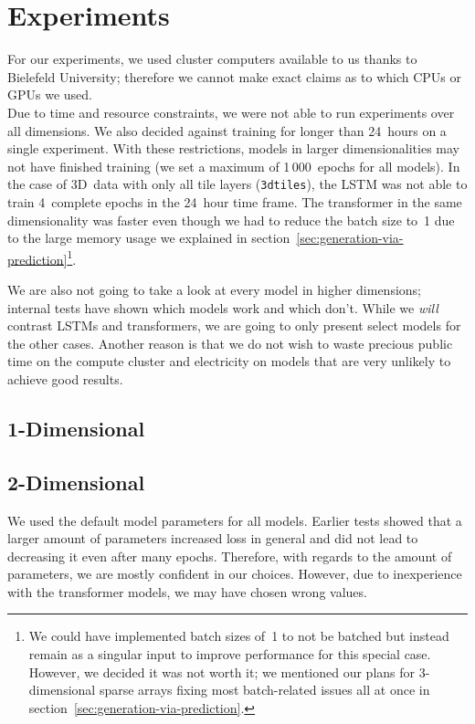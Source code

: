 \section{Experiments}

For our experiments, we used cluster computers available to us thanks
to Bielefeld University; therefore we cannot make exact claims as to
which CPUs or GPUs we used. \\
Due to time and resource constraints, we were not able to run
experiments over all dimensions. We also decided against training for
longer than 24~hours on a single experiment. With these restrictions,
models in larger dimensionalities may not have finished training (we
set a maximum of 1\,000~epochs for all models). In the case of 3D~data
with only all tile layers (\texttt{3dtiles}), the LSTM was not able to
train 4~complete epochs in the 24~hour time frame. The transformer in
the same dimensionality was faster even though we had to reduce the
batch size to~1 due to the large memory usage we explained in
section~\ref{sec:generation-via-prediction}\footnote{We could have
  implemented batch sizes of~1 to not be batched but instead remain as
  a singular input to improve performance for this special case.
  However, we decided it was not worth it; we mentioned our plans for
  3-dimensional sparse arrays fixing most batch-related issues all at
  once in section~\ref{sec:generation-via-prediction}.}.

We are also not going to take a look at every model in higher
dimensions; internal tests have shown which models work and which
don't. While we \emph{will} contrast LSTMs and transformers, we are
going to only present select models for the other cases. Another
reason is that we do not wish to waste precious public time on the
compute cluster and electricity on models that are very unlikely to
achieve good results.

\subsection{1-Dimensional}



\subsection{2-Dimensional}

We used the default model parameters for all models. Earlier tests
showed that a larger amount of parameters increased loss in general
and did not lead to decreasing it even after many epochs. Therefore,
with regards to the amount of parameters, we are mostly confident in
our choices. However, due to inexperience with the transformer models,
we may have chosen wrong values.

